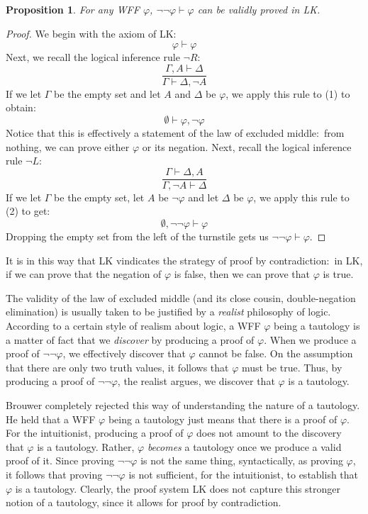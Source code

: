 \documentclass[11pt]{article}
\newtheorem{proposition}[theorem]{Proposition}
\theoremstyle{definition}
\theoremstyle{remark}
\begin{document}
\begin{proposition}
    For any WFF $\varphi$, $\neg\neg\varphi\vdash\varphi$ can be validly proved in LK.
\end{proposition}
\begin{proof}
    We begin with the axiom of LK:
    \begin{equation}
        \varphi\vdash\varphi
    \end{equation}
    Next, we recall the logical inference rule $\neg R$:
    $$\frac{\Gamma,A\vdash\Delta}{\Gamma\vdash\Delta,\neg A}$$
    If we let $\Gamma$ be the empty set and let $A$ and $\Delta$ be $\varphi$, we apply this rule to (1) to obtain:
    \begin{equation}
        \emptyset\vdash\varphi,\neg\varphi
    \end{equation}
    Notice that this is effectively a statement of the law of excluded middle:\ from nothing, we can prove either $\varphi$ or its negation. Next, recall the logical inference rule $\neg L$:
    $$\frac{\Gamma\vdash\Delta,A}{\Gamma,\neg A\vdash\Delta}$$
    If we let $\Gamma$ be the empty set, let $A$ be $\neg\varphi$ and let $\Delta$ be $\varphi$, we apply this rule to (2) to get:
    \begin{equation}
        \emptyset,\neg\neg\varphi\vdash\varphi
    \end{equation}
    Dropping the empty set from the left of the turnstile gets us $\neg\neg\varphi\vdash\varphi$.
\end{proof}
\noindent
It is in this way that LK vindicates the strategy of proof by contradiction:\ in LK, if we can prove that the negation of $\varphi$ is false, then we can prove that $\varphi$ is true.\par 

The validity of the law of excluded middle (and its close cousin, double-negation elimination) is usually taken to be justified by a \textit{realist} philosophy of logic. According to a certain style of realism about logic, a WFF $\varphi$ being a tautology is a matter of fact that we \textit{discover} by producing a proof of $\varphi$. When we produce a proof of $\neg\neg\varphi$, we effectively discover that $\varphi$ cannot be false. On the assumption that there are only two truth values, it follows that $\varphi$ must be true. Thus, by producing a proof of $\neg\neg\varphi$, the realist argues, we discover that $\varphi$ is a tautology.\par 

Brouwer completely rejected this way of understanding the nature of a tautology. He held that a WFF $\varphi$ being a tautology just means that there is a proof of $\varphi$. For the intuitionist, producing a proof of $\varphi$ does not amount to the discovery that $\varphi$ is a tautology. Rather, $\varphi$ \textit{becomes} a tautology once we produce a valid proof of it. Since proving $\neg\neg\varphi$ is not the same thing, syntactically, as proving $\varphi$, it follows that proving $\neg\neg\varphi$ is not sufficient, for the intuitionist, to establish that $\varphi$ is a tautology. Clearly, the proof system LK does not capture this stronger notion of a tautology, since it allows for proof by contradiction.\par 
\end{document}
